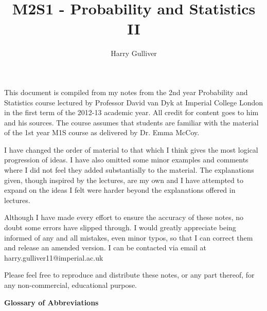 \documentclass[12pt,a4paper]{article}
\title{M2S1 - Probability and Statistics II}
\author{Harry Gulliver}
\begin{document}
\maketitle
{}

This document is compiled from my notes from the 2nd year Probability and Statistics course lectured by Professor David van Dyk at Imperial College London in the first term of the 2012-13 academic year. All credit for content goes to him and his sources. The course assumes that students are familiar with the material of the 1st year M1S course as delivered by Dr. Emma McCoy.

I have changed the order of material to that which I think gives the most logical progression of ideas. I have also omitted some minor examples and comments where I did not feel they added substantially to the material. The explanations given, though inspired by the lectures, are my own and I have attempted to expand on the ideas I felt were harder beyond the explanations offered in lectures.

Although I have made every effort to ensure the accuracy of these notes, no doubt some errors have slipped through. I would greatly appreciate being informed of any and all mistakes, even minor typos, so that I can correct them and release an amended version. I can be contacted via email at harry.gulliver11@imperial.ac.uk

Please feel free to reproduce and distribute these notes, or any part thereof, for any non-com\-mercial, educational purpose.

\tableofcontents
\vspace{50pt}

{\Large\bf Glossary of Abbreviations}
\vspace{12pt}
\end{document}
